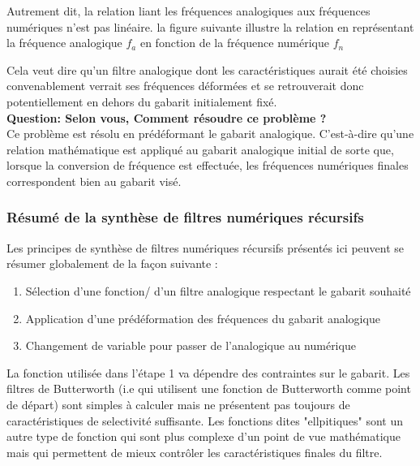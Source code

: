 \documentclass[11pt,a4paper]{article}
\begin{document}
Autrement dit, la relation liant les fréquences analogiques aux fréquences numériques n'est pas linéaire. la figure suivante illustre la relation en représentant la fréquence analogique $f_a$ en fonction de la fréquence numérique $f_n$

\begin{center}
\end{center}

Cela veut dire qu'un filtre analogique dont les caractéristiques aurait été choisies convenablement verrait ses fréquences déformées et se retrouverait donc potentiellement en dehors du gabarit initialement fixé.\\

\textbf{Question: Selon vous, Comment résoudre ce problème ?}\\

Ce problème  est résolu en prédéformant le gabarit analogique. C'est-à-dire qu'une relation mathématique est appliqué au gabarit analogique initial de sorte que, lorsque la conversion de fréquence est effectuée, les fréquences numériques finales correspondent bien au gabarit visé.\\

\subsubsection{Résumé de la synthèse de filtres numériques récursifs}
Les principes de synthèse de filtres numériques récursifs présentés ici peuvent se résumer globalement de la façon suivante :\\

\begin{enumerate}
\item Sélection d'une fonction/ d'un filtre analogique respectant le gabarit souhaité
\item Application d'une prédéformation des fréquences du gabarit analogique
\item Changement de variable pour passer de l'analogique au numérique
\end{enumerate}

La fonction utilisée dans l'étape 1 va dépendre des contraintes sur le gabarit. Les filtres de Butterworth (i.e qui utilisent une fonction de Butterworth comme point de départ) sont simples à calculer mais ne présentent pas toujours de caractéristiques de selectivité suffisante. Les fonctions dites "ellpitiques" sont un autre type de fonction qui sont plus complexe d'un point de vue mathématique mais qui permettent de mieux contrôler les caractéristiques finales du filtre.\\
\end{document}
